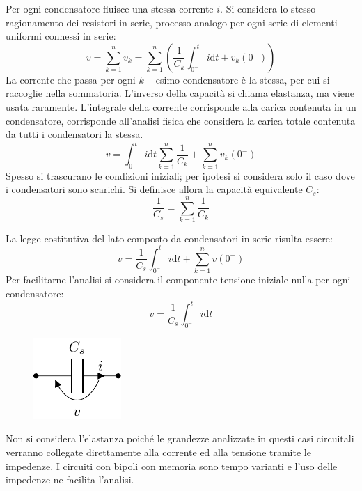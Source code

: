 \documentclass{article}
\newcommand{\df}{\mathrm{d}}
\numberwithin{equation}{subsection}
\begin{document}
Per ogni condensatore fluisce una stessa corrente $i$. Si considera lo stesso ragionamento dei resistori in serie, processo analogo per ogni serie di elementi uniformi 
connessi in serie:
\begin{equation*}
    v=\displaystyle\sum_{k=1}^nv_k=\sum_{k=1}^n\left(\frac{1}{C_k}\int_{0^-}^ti\df t+{v_k(0^-)}\right)
\end{equation*} 
La corrente che passa per ogni $k-$esimo condensatore è la stessa, per cui si raccoglie nella sommatoria. L'inverso della capacità si chiama elastanza, ma viene usata 
raramente. L'integrale della corrente corrisponde alla carica contenuta in un condensatore, corrisponde all'analisi fisica che considera la carica totale contenuta da tutti 
i condensatori la stessa. 
\begin{equation*}
    v=\displaystyle\int_{0^-}^ti\df t\sum_{k=1}^n\frac{1}{C_k}+\sum_{k=1}^nv_k(0^-)
\end{equation*}
Spesso si trascurano le condizioni iniziali; per ipotesi si considera solo il caso dove i condensatori sono scarichi. Si definisce allora la capacità equivalente $C_s$:
\begin{equation*}
    \displaystyle\frac{1}{C_s}=\sum_{k=1}^n\frac{1}{C_k}
\end{equation*}

La legge costitutiva del lato composto da condensatori in serie risulta essere:
\begin{equation*}
    v=\displaystyle\frac{1}{C_s}\int_{0^-}^ti\df t+\sum_{k=1}^nv(0^-)
\end{equation*}
Per facilitarne l'analisi si considera il componente tensione iniziale nulla per ogni condensatore:
\begin{equation}
    v=\displaystyle\frac{1}{C_s}\int_{0^-}^ti\df t
\end{equation}

\begin{figure}[H]%
    \centering
    \includegraphics{condensatore-serie-equivalente.pdf}%
    \label{fig:condensatore-serie-equivalente}
\end{figure}

Non si considera l'elastanza poiché le grandezze analizzate in questi casi circuitali verranno collegate direttamente alla corrente ed alla tensione tramite le impedenze. 
I circuiti con bipoli con memoria sono tempo varianti e l'uso delle impedenze ne facilita l'analisi. 
\end{document}
